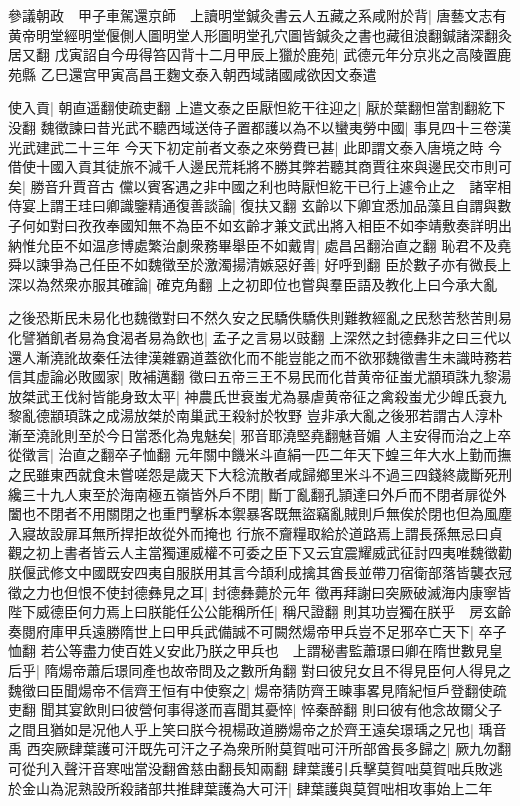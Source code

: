參議朝政　甲子車駕還京師　上讀明堂鍼灸書云人五藏之系咸附於背|{
	唐藝文志有黄帝明堂經明堂偃側人圖明堂人形圖明堂孔穴圖皆鍼灸之書也藏徂浪翻鍼諸深翻灸居又翻}
戊寅詔自今毋得笞囚背十二月甲辰上獵於鹿苑|{
	武德元年分京兆之高陵置鹿苑縣}
乙巳還宫甲寅高昌王麴文泰入朝西域諸國咸欲因文泰遣

使入貢|{
	朝直遥翻使疏吏翻}
上遣文泰之臣厭怛紇干往迎之|{
	厭於葉翻怛當割翻紇下没翻}
魏徵諫曰昔光武不聽西域送侍子置都護以為不以蠻夷勞中國|{
	事見四十三卷漢光武建武二十三年}
今天下初定前者文泰之來勞費已甚|{
	此即謂文泰入唐境之時}
今借使十國入貢其徒旅不減千人邊民荒耗將不勝其弊若聽其商賈往來與邊民交市則可矣|{
	勝音升賈音古}
儻以賓客遇之非中國之利也時厭怛紇干已行上遽令止之　諸宰相侍宴上謂王珪曰卿識鑒精通復善談論|{
	復扶又翻}
玄齡以下卿宜悉加品藻且自謂與數子何如對曰孜孜奉國知無不為臣不如玄齡才兼文武出將入相臣不如李靖敷奏詳明出納惟允臣不如温彦博處繁治劇衆務畢舉臣不如戴胄|{
	處昌呂翻治直之翻}
恥君不及堯舜以諫爭為己任臣不如魏徵至於激濁揚清嫉惡好善|{
	好呼到翻}
臣於數子亦有微長上深以為然衆亦服其確論|{
	確克角翻}
上之初即位也嘗與羣臣語及教化上曰今承大亂

之後恐斯民未易化也魏徵對曰不然久安之民驕佚驕佚則難教經亂之民愁苦愁苦則易化譬猶飢者易為食渴者易為飲也|{
	孟子之言易以豉翻}
上深然之封德彝非之曰三代以還人漸澆訛故秦任法律漢雜霸道蓋欲化而不能豈能之而不欲邪魏徵書生未識時務若信其虚論必敗國家|{
	敗補邁翻}
徵曰五帝三王不易民而化昔黄帝征蚩尤顓頊誅九黎湯放桀武王伐紂皆能身致太平|{
	神農氏世衰蚩尤為暴虐黄帝征之禽殺蚩尤少皥氏衰九黎亂德顓頊誅之成湯放桀於南巢武王殺紂於牧野}
豈非承大亂之後邪若謂古人淳朴漸至澆訛則至於今日當悉化為鬼魅矣|{
	邪音耶澆堅堯翻魅音媚}
人主安得而治之上卒從徵言|{
	治直之翻卒子恤翻}
元年關中饑米斗直絹一匹二年天下蝗三年大水上勤而撫之民雖東西就食未嘗嗟怨是歲天下大稔流散者咸歸鄉里米斗不過三四錢終歲斷死刑纔三十九人東至於海南極五嶺皆外戶不閉|{
	斷丁亂翻孔頴達曰外戶而不閉者扉從外闔也不閉者不用關閉之也重門擊柝本禦暴客既無盜竊亂賊則戶無俟於閉也但為風塵入寢故設扉耳無所捍拒故從外而掩也}
行旅不齎糧取給於道路焉上謂長孫無忌曰貞觀之初上書者皆云人主當獨運威權不可委之臣下又云宜震耀威武征討四夷唯魏徵勸朕偃武修文中國既安四夷自服朕用其言今頡利成擒其酋長並帶刀宿衛部落皆襲衣冠徵之力也但恨不使封德彝見之耳|{
	封德彝薨於元年}
徵再拜謝曰突厥破滅海内康寧皆陛下威德臣何力焉上曰朕能任公公能稱所任|{
	稱尺證翻}
則其功豈獨在朕乎　房玄齡奏閱府庫甲兵遠勝隋世上曰甲兵武備誠不可闕然煬帝甲兵豈不足邪卒亡天下|{
	卒子恤翻}
若公等盡力使百姓乂安此乃朕之甲兵也　上謂秘書監蕭璟曰卿在隋世數見皇后乎|{
	隋煬帝蕭后璟同產也故帝問及之數所角翻}
對曰彼兒女且不得見臣何人得見之魏徵曰臣聞煬帝不信齊王恒有中使察之|{
	煬帝猜防齊王暕事畧見隋紀恒戶登翻使疏吏翻}
聞其宴飲則曰彼營何事得遂而喜聞其憂悴|{
	悴秦醉翻}
則曰彼有他念故爾父子之間且猶如是况他人乎上笑曰朕今視楊政道勝煬帝之於齊王遠矣璟瑀之兄也|{
	瑀音禹}
西突厥肆葉護可汗既先可汗之子為衆所附莫賀咄可汗所部酋長多歸之|{
	厥九勿翻可從刋入聲汗音寒咄當没翻酋慈由翻長知兩翻}
肆葉護引兵擊莫賀咄莫賀咄兵敗逃於金山為泥熟設所殺諸部共推肆葉護為大可汗|{
	肆葉護與莫賀咄相攻事始上二年}



